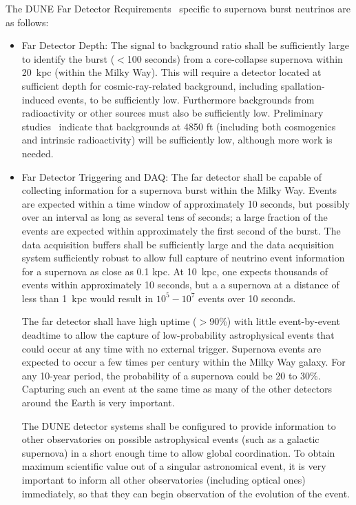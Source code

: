 The DUNE Far Detector
Requirements~\cite{lbnfdune-cdr-req} specific to supernova burst neutrinos are as follows:

\begin{itemize}

\item Far Detector Depth: The signal to background ratio shall be sufficiently large to identify the  burst ($<$100 seconds)  from a core-collapse supernova within 20~kpc (within the Milky Way). This will require a detector located at sufficient depth for cosmic-ray-related background, including spallation-induced events, to be sufficiently low.  Furthermore backgrounds from radioactivity or other sources must also be sufficiently low.  Preliminary studies~\cite{gehman} indicate that backgrounds at 4850 ft (including both cosmogenics and intrinsic radioactivity) will be sufficiently low, although more work is needed.

\item Far Detector Triggering and DAQ:  The far detector shall be capable of collecting information for a supernova burst within the Milky Way.  Events are expected within a time window of approximately 10 seconds, but possibly over an interval as long as several tens of seconds; a large fraction of the events are expected within approximately the first second of the burst.
The data acquisition buffers shall be sufficiently large and the data acquisition system sufficiently robust to allow full capture of neutrino event information for a supernova as close as 0.1 kpc.
At 10~kpc, one expects thousands of events within approximately 10 seconds, but a a supernova at a distance of less than 1~kpc would result in $10^5-10^7$  events over 10 seconds.    

The far detector shall have high uptime ($>$90\%) with little event-by-event deadtime to allow the capture of low-probability astrophysical events that could occur at any time with no external trigger. 
Supernova events are expected to occur a few times per century within the Milky Way galaxy. For any 10-year period, the probability of a supernova could be 20 to 30\%.  Capturing such an event at the same time as many of the other detectors around the Earth is very important.  

The DUNE detector systems shall be configured to provide  information to other observatories on possible astrophysical events (such as a galactic supernova) in a short enough time to allow global coordination.   
To obtain maximum scientific value out of a singular astronomical event, it is very important to inform all other observatories (including optical ones) immediately, so that they can begin observation of the evolution of the event. 


\end{itemize}
